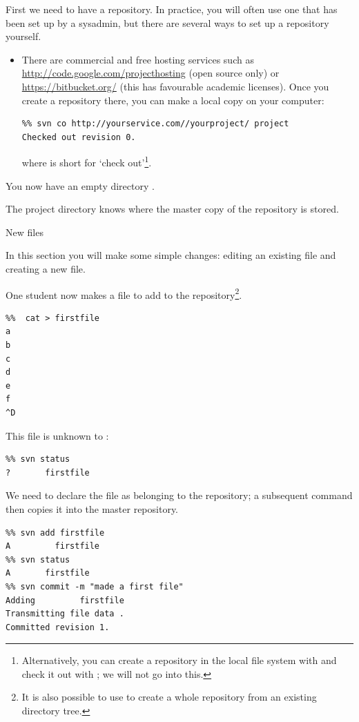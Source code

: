 First we need to have a repository. In practice, you will often use
one that has been set up by a sysadmin, but there are several ways to
set up a repository yourself.
\begin{itemize}
\item There are commercial and free hosting services such as 
  \url{http://code.google.com/projecthosting} (open source only) or
   \url{https://bitbucket.org/}
  (this has favourable academic licenses). Once you create a
  repository there, you can make a local copy on your computer:
\begin{verbatim}
%% svn co http://yourservice.com//yourproject/ project
Checked out revision 0.
\end{verbatim}
where  is short for `check out'\footnote{Alternatively, you can create a repository in the local file system with  and check it out with ; we will not go into this.}.
\end{itemize}
You now have an empty directory .


The project directory knows where the master copy of the repository is
stored.



 {New files}

\begin{purpose}
  In this section you will make some simple changes: editing an
  existing file and creating a new file.
\end{purpose}

One student now makes a file to add to the repository\footnote{It is
  also possible to use  to create a whole repository
  from an existing directory tree.}.
\begin{verbatim}
%%  cat > firstfile
a
b
c
d
e
f
^D
\end{verbatim}
This file is unknown to :
\begin{verbatim}
%% svn status
?       firstfile
\end{verbatim}
We need to declare the file as belonging to the repository; a
subsequent  command then copies it into the master repository.
\begin{verbatim}
%% svn add firstfile 
A         firstfile
%% svn status
A       firstfile
%% svn commit -m "made a first file"
Adding         firstfile
Transmitting file data .
Committed revision 1.
\end{verbatim}

